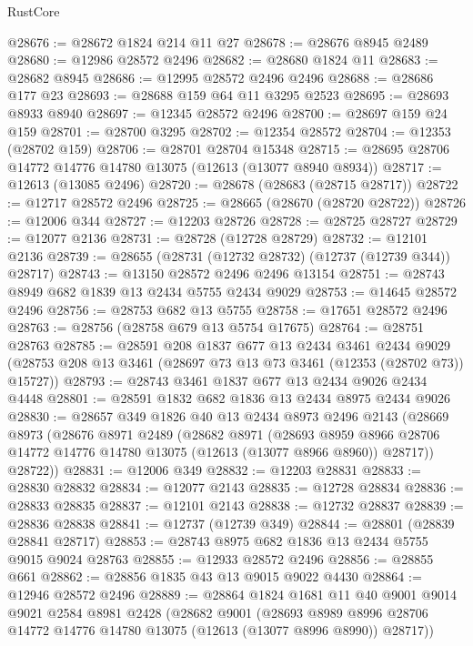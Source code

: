 \begin{lexlean}{RustCore}
\begin{coremodule}
@28676 := @28672 @1824 @214 @11 @27
@28678 := @28676 @8945 @2489
@28680 := @12986 @28572 @2496
@28682 := @28680 @1824 @11
@28683 := @28682 @8945
@28686 := @12995 @28572 @2496 @2496
@28688 := @28686 @177 @23
@28693 := @28688 @159 @64 @11 @3295 @2523
@28695 := @28693 @8933 @8940
@28697 := @12345 @28572 @2496
@28700 := @28697 @159 @24 @159
@28701 := @28700 @3295
@28702 := @12354 @28572
@28704 := @12353 (@28702 @159)
@28706 := @28701 @28704 @15348
@28715 := @28695 @28706 @14772 @14776 @14780 @13075 (@12613 (@13077 @8940 @8934))
@28717 := @12613 (@13085 @2496)
@28720 := @28678 (@28683 (@28715 @28717))
@28722 := @12717 @28572 @2496
@28725 := @28665 (@28670 (@28720 @28722))
@28726 := @12006 @344
@28727 := @12203 @28726
@28728 := @28725 @28727
@28729 := @12077 @2136
@28731 := @28728 (@12728 @28729)
@28732 := @12101 @2136
@28739 := @28655 (@28731 (@12732 @28732) (@12737 (@12739 @344)) @28717)
@28743 := @13150 @28572 @2496 @2496 @13154
@28751 := @28743 @8949 @682 @1839 @13 @2434 @5755 @2434 @9029
@28753 := @14645 @28572 @2496
@28756 := @28753 @682 @13 @5755
@28758 := @17651 @28572 @2496
@28763 := @28756 (@28758 @679 @13 @5754 @17675)
@28764 := @28751 @28763
@28785 := @28591
    @208
    @1837
    @677
    @13
    @2434
    @3461
    @2434
    @9029
    (@28753 @208 @13 @3461 (@28697 @73 @13 @73 @3461 (@12353 (@28702 @73)) @15727))
@28793 := @28743 @3461 @1837 @677 @13 @2434 @9026 @2434 @4448
@28801 := @28591 @1832 @682 @1836 @13 @2434 @8975 @2434 @9026
@28830 := @28657
    @349
    @1826
    @40
    @13
    @2434
    @8973
    @2496
    @2143
    (@28669
      @8973
      (@28676
        @8971
        @2489
        (@28682
          @8971
          (@28693
            @8959
            @8966
            @28706
            @14772
            @14776
            @14780
            @13075
            (@12613 (@13077 @8966 @8960))
            @28717))
        @28722))
@28831 := @12006 @349
@28832 := @12203 @28831
@28833 := @28830 @28832
@28834 := @12077 @2143
@28835 := @12728 @28834
@28836 := @28833 @28835
@28837 := @12101 @2143
@28838 := @12732 @28837
@28839 := @28836 @28838
@28841 := @12737 (@12739 @349)
@28844 := @28801 (@28839 @28841 @28717)
@28853 := @28743 @8975 @682 @1836 @13 @2434 @5755 @9015 @9024 @28763
@28855 := @12933 @28572 @2496
@28856 := @28855 @661
@28862 := @28856 @1835 @43 @13 @9015 @9022 @4430
@28864 := @12946 @28572 @2496
@28889 := @28864
    @1824
    @1681
    @11
    @40
    @9001
    @9014
    @9021
    @2584
    @8981
    @2428
    (@28682
      @9001
      (@28693 @8989 @8996 @28706 @14772 @14776 @14780 @13075 (@12613 (@13077 @8996 @8990)) @28717))

\end{coremodule}
\end{lexlean}
